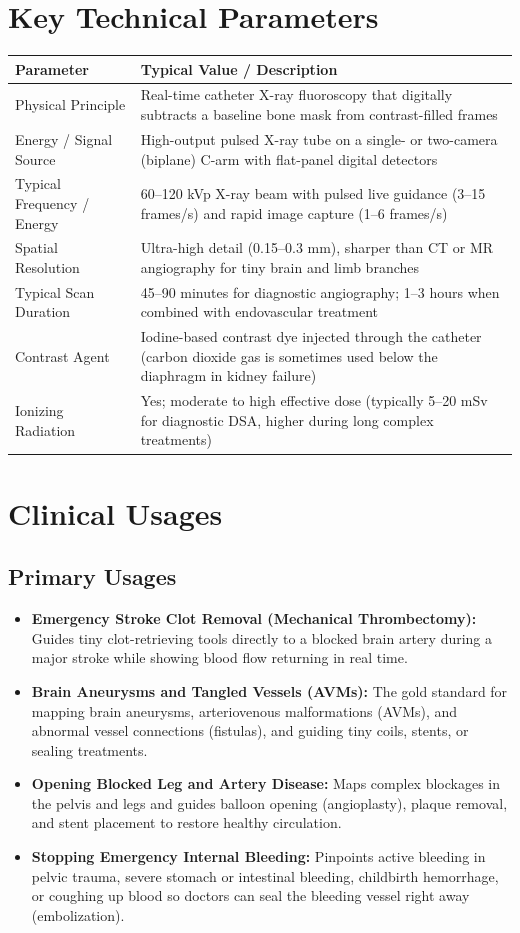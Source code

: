 \section{Key Technical Parameters}
\noindent
\begin{tabularx}{\textwidth}{@{}l X@{}}
\toprule
\textbf{Parameter} & \textbf{Typical Value / Description} \\
\midrule
Physical Principle & Real-time catheter X-ray fluoroscopy that digitally subtracts a baseline bone mask from contrast-filled frames \\
Energy / Signal Source & High-output pulsed X-ray tube on a single- or two-camera (biplane) C-arm with flat-panel digital detectors \\
Typical Frequency / Energy & 60--120 kVp X-ray beam with pulsed live guidance (3--15 frames/s) and rapid image capture (1--6 frames/s) \\
Spatial Resolution & Ultra-high detail (0.15--0.3 mm), sharper than CT or MR angiography for tiny brain and limb branches \\
Typical Scan Duration & 45--90 minutes for diagnostic angiography; 1--3 hours when combined with endovascular treatment \\
Contrast Agent & Iodine-based contrast dye injected through the catheter (carbon dioxide gas is sometimes used below the diaphragm in kidney failure) \\
Ionizing Radiation & Yes; moderate to high effective dose (typically 5--20 mSv for diagnostic DSA, higher during long complex treatments) \\
\bottomrule
\end{tabularx}

\section{Clinical Usages}

\subsection{Primary Usages}
\begin{itemize}
\item \textbf{Emergency Stroke Clot Removal (Mechanical Thrombectomy):} Guides tiny clot-retrieving tools directly to a blocked brain artery during a major stroke while showing blood flow returning in real time.
\item \textbf{Brain Aneurysms and Tangled Vessels (AVMs):} The gold standard for mapping brain aneurysms, arteriovenous malformations (AVMs), and abnormal vessel connections (fistulas), and guiding tiny coils, stents, or sealing treatments.
\item \textbf{Opening Blocked Leg and Artery Disease:} Maps complex blockages in the pelvis and legs and guides balloon opening (angioplasty), plaque removal, and stent placement to restore healthy circulation.
\item \textbf{Stopping Emergency Internal Bleeding:} Pinpoints active bleeding in pelvic trauma, severe stomach or intestinal bleeding, childbirth hemorrhage, or coughing up blood so doctors can seal the bleeding vessel right away (embolization).
\end{itemize}

